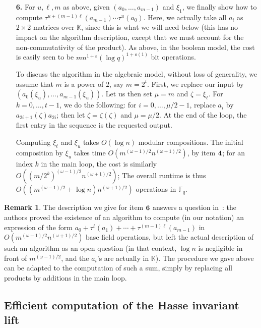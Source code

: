 \documentclass[12pt]{article}
\theoremstyle{plain}
\theoremstyle{definition}
\newtheorem*{remark}{Remark}
\def\F{\ensuremath{\mathbb{F}}}
\def\K{\ensuremath{\mathbb{K}}}
\begin{document}
\begin{enumerate}
\item [{\bf 6.}] For $u,\ell,m$ as above, given $(a_0,\dots,a_{m-1})$
  and $\xi_1$, we finally show how to compute
  $\tau^{u+(m-1)\ell}(a_{m-1}) \cdots \tau^{u}(a_0).$ Here, we
  actually take all $a_i$ as $2\times 2$ matrices over $\K$, since
  this is what we will need below (this has no impact on the algorithm
  description, except that we must account for the non-commutativity
  of the product). As above, in the boolean model, the cost is easily
  seen to be $m n^{1+\varepsilon} (\log q)^{1+o(1)}$ bit operations.
  
  To discuss the algorithm in the algebraic model, without loss of
  generality, we assume that $m$ is a power of $2$, say
  $m=2^t$. First, we replace our input by
  $(a_0(\xi_u),\dots,a_{m-1}(\xi_u))$. Let us then set $\mu=m$ and
  $\zeta=\xi_\ell$.  For $k=0,\dots,t-1$, we do the following: for
  $i=0,\dots,\mu/2-1$, replace $a_i$ by $a_{2i+1}(\zeta) a_{2i}$; then
  let $\zeta=\zeta(\zeta)$ and $\mu=\mu/2$.  At the end of the loop,
  the first entry in the sequence is the requested output.

  Computing $\xi_\ell$ and $\xi_u$ takes $O(\log n)$ modular
  compositions.  The initial composition by $\xi_u$ takes time
  $O(m^{(\omega-1)/2}n^{(\omega+1)/2})$, by item ${\bf 4}$; for an
  index $k$ in the main loop, the cost is similarly
  $O((m/2^k)^{(\omega-1)/2}n^{(\omega+1)/2})$; The overall runtime is
  thus $O((m^{(\omega-1)/2}+\log n)n^{(\omega+1)/2})$
  operations in $\F_q$.
\end{enumerate}


\begin{remark}
  The description we give for item ${\bf 6}$ answers a question
  in~\cite[Section~3.2]{ks}: the authors proved the existence of an
  algorithm to compute (in our notation) an expression of the form
  $a_0 + \tau^\ell(a_1) + \cdots + \tau^{(m-1)\ell}(a_{m-1})$
in
  $O(m^{(\omega-1)/2}n^{(\omega+1)/2})$ base field operations, but left
  the actual description of such an algorithm as an open question
  (in that context, $\log n$ is negligible in front of $m^{(\omega-1)/2}$,
  and the $a_i$'s are actually in $\K$).
  The procedure we gave above can be adapted to the computation
  of such a sum, simply by replacing all products by additions 
  in the main loop.
\end{remark}


\subsection{Efficient computation of the Hasse invariant lift}
\end{document}
